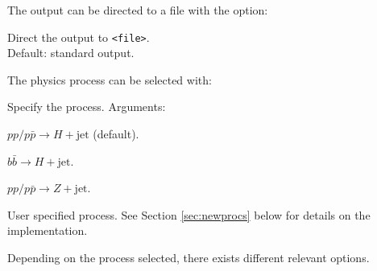 \documentclass[12pt]{article}
\begin{document}
\noindent
The output can be directed to a file with the option: 
\begin{description}[labelindent=1cm, labelwidth =\widthof{\bfseries9999999999999999999999}, leftmargin = !] 
	\item[\texttt{-o, -{}-out <file>}] Direct the output to \texttt{<file>}.\\ Default: standard output.
\end{description}
The physics process can be selected with: 
\begin{description}[labelindent=1cm, labelwidth =\widthof{\bfseries9999999999999999999999}, leftmargin = !] 
	\item[\texttt{-{}-proc <arg>}] Specify the process. Arguments: \vspace{-2mm} 
	\begin{description}[labelwidth =\widthof{\bfseries99999}, leftmargin = !] 
		\item[\texttt{H}] $pp/p\bar{p} \rightarrow H + \text{jet}$ (default). 
		\item[\texttt{bbH}] $b\bar{b} \rightarrow H + \text{jet}$. 
		\item[\texttt{Z}] $pp/p\bar{p} \rightarrow Z + \text{jet}$. 
		\item[\texttt{user}] User specified process. See Section \ref{sec:newprocs} below for details on the implementation. 
	\end{description}
\end{description}
Depending on the process selected, there exists different relevant options. 
\end{document}
